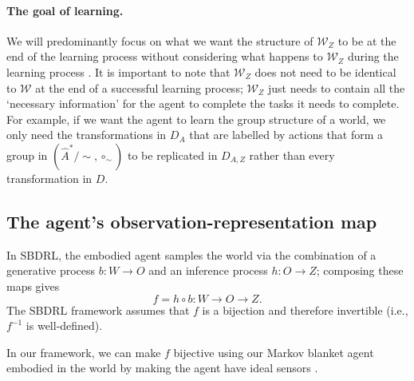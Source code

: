 \paragraph{The goal of learning.}
We will predominantly focus on what we want the structure of $\mathscr{W}_{Z}$ to be at the end of the learning process without considering what happens to $\mathscr{W}_{Z}$ during the learning process .
It is important to note that $\mathscr{W}_{Z}$ does not need to be identical to $\mathscr{W}$ at the end of a successful learning process; $\mathscr{W}_{Z}$ just needs to contain all the `necessary information' for the agent to complete the tasks it needs to complete.
For example, if we want the agent to learn the group structure of a world, we only need the transformations in $D_{A}$ that are labelled by actions that form a group in $(\hat{A}^{*}/\sim, \circ_{\sim})$ to be replicated in $D_{A, Z}$ rather than every transformation in $D$.



\subsection{The agent's observation-representation map}

In SBDRL, the embodied agent 
samples the world via the combination of a generative process $b: W \to O$ and an inference process $h: O \to Z$; composing these maps gives
\begin{equation}
    f = h \circ b: W \to O \to Z.
\end{equation}
The SBDRL framework assumes that $f$ is a bijection and therefore invertible (i.e., $f^{-1}$ is well-defined).

In our framework, we can make $f$ bijective using our Markov blanket agent embodied in the world by making the agent have ideal sensors .

